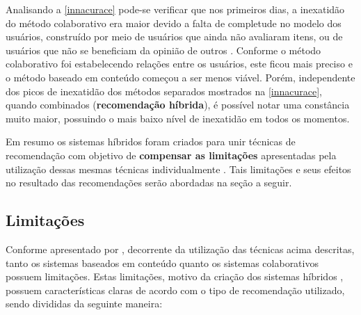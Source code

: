 Analisando a \autoref{innacurace} pode-se verificar que nos primeiros dias, a inexatidão do método colaborativo era maior devido a falta de completude no modelo dos usuários, construído por meio de usuários que ainda não avaliaram itens, ou de usuários que não se beneficiam da opinião de outros \cite{claypool1999combining}. Conforme o método colaborativo foi estabelecendo relações entre os usuários, este ficou mais preciso e o método baseado em conteúdo começou a ser menos viável. Porém, independente dos picos de inexatidão dos métodos separados mostrados na \autoref{innacurace}, quando combinados (\textbf{recomendação híbrida}), é possível notar uma constância muito maior, possuindo o mais baixo nível de inexatidão em todos os momentos.

Em resumo os sistemas híbridos foram criados para unir técnicas de recomendação com objetivo de \textbf{compensar as limitações} apresentadas pela utilização dessas mesmas técnicas individualmente \cite{balabanovic1997fab}. Tais limitações e seus efeitos no resultado das recomendações serão abordadas na seção a seguir.

\subsection{Limitações}

Conforme apresentado por , decorrente da utilização das técnicas acima descritas, tanto os sistemas baseados em conteúdo quanto os sistemas colaborativos possuem limitações. Estas limitações, motivo da criação dos sistemas híbridos \cite{balabanovic1997fab}, possuem características claras de acordo com o tipo de recomendação utilizado, sendo divididas da seguinte maneira:

